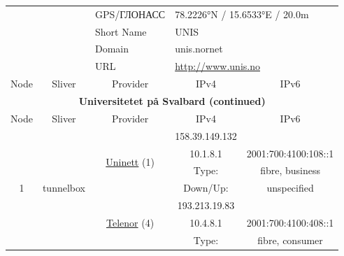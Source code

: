 \begin{small}
\begin{center}
\begin{longtable}{|c|c|c|c|c|c|c|c|}
 \multicolumn{4}{|c|}{} & \multicolumn{1}{|l|}{GPS/ГЛОНАСС} & \multicolumn{3}{|l|}{78.2226°N / 15.6533°E / 20.0m} \\* \cline{5-5}\cline{6-6}\cline{7-7}\cline{8-8}
 \multicolumn{4}{|c|}{} & \multicolumn{1}{|l|}{Short Name} & \multicolumn{3}{|l|}{\nomenclature{UNIS}{Universitetet på Svalbard}\index{UNIS|see{Universitetet på Svalbard}}UNIS} \\* \cline{5-5}\cline{6-6}\cline{7-7}\cline{8-8}
 \multicolumn{4}{|c|}{} & \multicolumn{1}{|l|}{Domain} & \multicolumn{3}{|l|}{\index{unis.nornet}unis.nornet} \\* \cline{5-5}\cline{6-6}\cline{7-7}\cline{8-8}
 \multicolumn{4}{|c|}{} & \multicolumn{1}{|l|}{URL} & \multicolumn{3}{|l|}{\url{http://www.unis.no}} \\ \hline
 \multicolumn{2}{|p{8em}|}{Node} & \multicolumn{2}{|p{8em}|}{Sliver} & \multicolumn{2}{|p{8em}|}{Provider} & IPv4 & IPv6 \\ \hline
\endfirsthead
\hline
 \multicolumn{8}{|c|}{\textbf{Universitetet på Svalbard (continued)}} \\ \hline
 \multicolumn{2}{|p{8em}|}{Node} & \multicolumn{2}{|p{8em}|}{Sliver} & \multicolumn{2}{|p{8em}|}{Provider} & IPv4 & IPv6 \\ \hline
\endhead
 \multirow{8}{*}{\tiny{1}} & \multicolumn{3}{|c|}{\multirow{8}{*}{\tiny{tunnelbox}}} & \multicolumn{2}{|c|}{\multirow{4}{*}{\tiny{\href{https://www.uninett.no}{Uninett} (1)}}} & \tiny{158.39.149.132} & \frownie{} \\* \cline{7-7}\cline{8-8}
  & \multicolumn{3}{|c|}{} & \multicolumn{2}{|c|}{} & \tiny{10.1.8.1} & \tiny{2001:700:4100:108::1} \\* \cline{7-7}\cline{8-8}
  & \multicolumn{3}{|c|}{} & \multicolumn{2}{|c|}{} & Type: & fibre, business \\* \cline{7-7}\cline{8-8}
  & \multicolumn{3}{|c|}{} & \multicolumn{2}{|c|}{} & Down/Up:  & unspecified \\* \cline{5-5}\cline{6-6}\cline{7-7}\cline{8-8}
  & \multicolumn{3}{|c|}{} & \multicolumn{2}{|c|}{\multirow{4}{*}{\tiny{\href{https://www.telenor.no}{Telenor} (4)}}} & \tiny{193.213.19.83} & \frownie{} \\* \cline{7-7}\cline{8-8}
  & \multicolumn{3}{|c|}{} & \multicolumn{2}{|c|}{} & \tiny{10.4.8.1} & \tiny{2001:700:4100:408::1} \\* \cline{7-7}\cline{8-8}
  & \multicolumn{3}{|c|}{} & \multicolumn{2}{|c|}{} & Type: & fibre, consumer \\* \cline{7-7}\cline{8-8}

\end{longtable}
\end{center}
\end{small}
